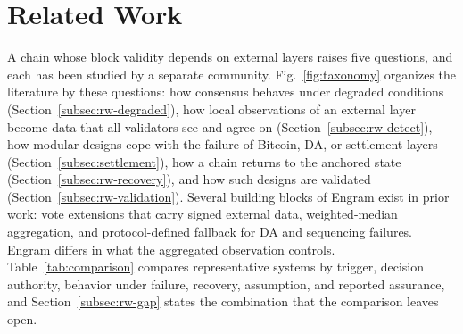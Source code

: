 \section{Related Work}
\label{sec:related}

A chain whose block validity depends on external layers raises five
questions, and each has been studied by a separate community.
Fig.~\ref{fig:taxonomy} organizes the literature by these questions:
how consensus behaves under degraded conditions (Section~\ref{subsec:rw-degraded}),
how local observations of an external layer become data that all validators
see and agree on (Section~\ref{subsec:rw-detect}), how modular designs cope with
the failure of Bitcoin, DA, or settlement layers (Section~\ref{subsec:settlement}),
how a chain returns to the anchored state (Section~\ref{subsec:rw-recovery}),
and how such designs are validated (Section~\ref{subsec:rw-validation}).
Several building blocks of Engram exist in prior work: vote extensions that carry
signed external data, weighted-median aggregation, and protocol-defined
fallback for DA and sequencing failures. Engram differs in what the aggregated
observation controls. Table~\ref{tab:comparison} compares representative systems
by trigger, decision authority, behavior under failure, recovery, assumption,
and reported assurance, and
Section~\ref{subsec:rw-gap} states the combination that the comparison leaves open.

